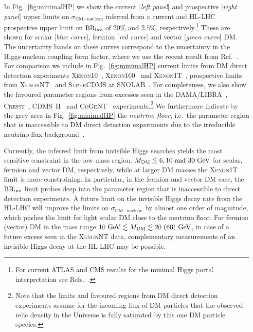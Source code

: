 \documentclass[../report.tex]{subfiles}
\begin{document}
In Fig.~\ref{fig:minimalHP} we show the current [\emph{left panel}] and prospective [\emph{right panel}] upper limits on $\sigma_{\text{DM}-\text{nucleon}}$ inferred from a current and HL-LHC prospective upper limit on $\mathrm{BR}_\mathrm{inv}$ of $20\%$ and $2.5\%$, respectively.\footnote{For current  ATLAS and CMS results for the minimal Higgs portal interpretation see Refs.~\cite{Aad:2015pla,Khachatryan:2016whc,Aaboud:2018sfi,Sirunyan:2018owy,ATLAS-CONF-2018-054}.} These are shown for scalar [\emph{blue curve}], fermion [\emph{red curve}]  and vector [\emph{green curve}] DM. The uncertainty bands on these curves correspond to the uncertainty in the Higgs-nucleon coupling form factor, where we use the recent result from Ref.~\cite{Hoferichter:2017olk}. For comparison we include in Fig.~\ref{fig:minimalHP} current limits from DM direct detection experiments \textsc{Xenon10}~\cite{Angle:2011th}, \textsc{Xenon100}~\cite{Aprile:2012nq} and \textsc{Xenon1T}~\cite{Aprile:2018dbl}, prospective limits from \textsc{XenonNT}~\cite{Aprile:2015uzo} and \textsc{SuperCDMS} at SNOLAB~\cite{Agnese:2016cpb}. For completeness, we also show the favoured parameter regions from excesses seen in the \textsc{DAMA/LIBRA}~\cite{Savage:2008er}, \textsc{Cresst}~\cite{Angloher:2011uu}, \textsc{CDMS~II}~\cite{Agnese:2013rvf} and \textsc{CoGeNT}~\cite{Aalseth:2012if} experiments.\footnote{Note that the limits and favoured regions from DM direct detection experiments assume for the incoming flux of DM particles that the observed relic density in the Universe is fully saturated by this one DM particle species.} We furthermore indicate by the grey area in Fig.~\ref{fig:minimalHP} the \emph{neutrino floor}, i.e.~the parameter region that is inaccessible to DM direct detection experiments due to the irreducible neutrino flux background~\cite{Billard:2013qya}.

Currently, the inferred limit from invisible Higgs searches yields the most sensitive constraint in the low mass region, $M_\text{DM} \lesssim 6, 10~\mbox{and}~30~\text{GeV}$ for scalar, fermion and vector DM, respectively, while at larger DM masses the \textsc{Xenon1T} limit is more constraining. In particular, in the fermion and vector DM case, the $\mathrm{BR}_\mathrm{inv}$ limit probes deep into the parameter region that is inaccessible to direct detection experiments. A future limit on the invisible Higgs decay rate from the HL-LHC will improve the limits on $\sigma_{\text{DM}-\text{nucleon}}$ by almost one order of magnitude, which pushes the limit for light scalar DM close to the neutrino floor. For fermion (vector) DM in the mass range $10~\text{GeV} \lesssim M_{\text{DM}} \lesssim 20~(60)~\text{GeV}$, in case of a future excess seen in the \textsc{XenonNT} data, complementary measurements of an invisible Higgs decay at the HL-LHC may be possible. 
\end{document}
